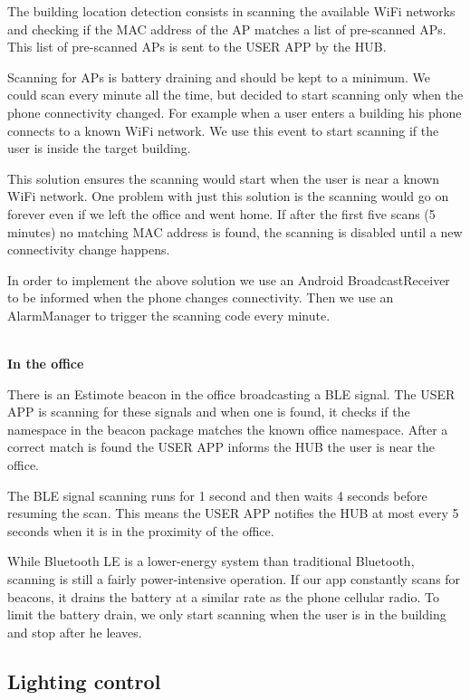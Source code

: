 The building location detection consists in scanning the available \ac{WiFi} networks and checking if the \ac{MAC} address of the \ac{AP} matches a list of pre-scanned \ac{AP}s. This list of pre-scanned \ac{AP}s is sent to the USER APP by the HUB.  

Scanning for \ac{AP}s is battery draining and should be kept to a minimum. We could scan every minute all the time, but decided to start scanning only when the phone connectivity changed. For example when a user enters a building his phone connects to a known \ac{WiFi} network. We use this event to start scanning if the user is inside the target building.


This solution ensures the scanning would start when the user is near a known \ac{WiFi} network. One problem with just this solution is the scanning would go on forever even if we left the office and went home. If after the first five scans (5 minutes) no matching \ac{MAC} address is found, the scanning is disabled until a new connectivity change happens. 


In order to implement the above solution we use an Android BroadcastReceiver to be informed when the phone changes connectivity. Then we use an AlarmManager to trigger the scanning code every minute.

\mbox{}\\
\textbf{In the office}

There is an Estimote beacon in the office broadcasting a \ac{BLE} signal. The USER APP is scanning for these signals and when one is found, it checks if the namespace in the beacon package matches the known office namespace. After a correct match is found the USER APP informs the HUB the user is near the office.

The \ac{BLE} signal scanning runs for 1 second and then waits 4 seconds before resuming the scan. This means the USER APP notifies the HUB at most every 5 seconds when it is in the proximity of the office.

While Bluetooth LE is a lower-energy system than traditional Bluetooth, scanning is still a fairly power-intensive operation. If our app constantly scans for beacons, it drains the battery at a similar rate as the phone cellular radio. To limit the battery drain, we only start scanning when the user is in the building and stop after he leaves.

\subsection{Lighting control}\label{light_imp}


